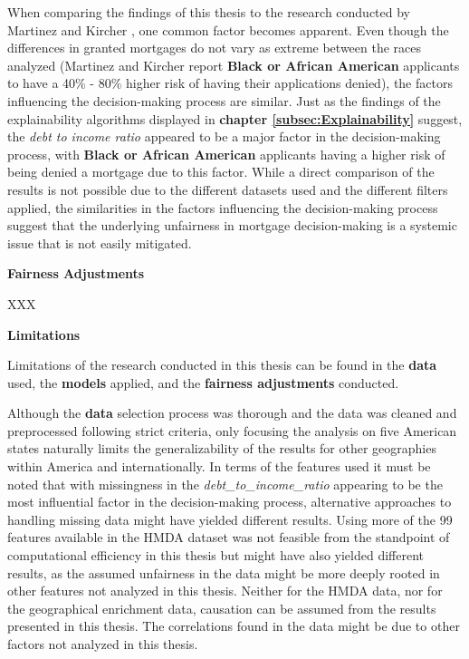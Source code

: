 When comparing the findings of this thesis to the research conducted by Martinez and Kircher \parencite{Martinez2021}, one common factor becomes apparent. Even though the differences in granted mortgages do not vary as extreme between the races analyzed (Martinez and Kircher report \textbf{Black or African American} applicants to have a 40\% - 80\% higher risk of having their applications denied), the factors influencing the decision-making process are similar.
Just as the findings of the explainability algorithms displayed in \textbf{chapter \ref{subsec:Explainability}} suggest, the \textit{debt to income ratio} appeared to be a major factor in the decision-making process, with \textbf{Black or African American} applicants having a higher risk of being denied a mortgage due to this factor.
While a direct comparison of the results is not possible due to the different datasets used and the different filters applied, the similarities in the factors influencing the decision-making process suggest that the underlying unfairness in mortgage decision-making is a systemic issue that is not easily mitigated.

\textbf{Fairness Adjustments}


XXX

\textbf{Limitations}

Limitations of the research conducted in this thesis can be found in the \textbf{data} used, the \textbf{models} applied, and the \textbf{fairness adjustments} conducted.


Although the \textbf{data} selection process was thorough and the data was cleaned and preprocessed following strict criteria, only focusing the analysis on five American states naturally limits the generalizability of the results for other geographies within America and internationally.
In terms of the features used it must be noted that with missingness in the \textit{debt\_to\_income\_ratio} appearing to be the most influential factor in the decision-making process, alternative approaches to handling missing data might have yielded different results.
Using more of the 99 features available in the HMDA dataset was not feasible from the standpoint of computational efficiency in this thesis but might have also yielded different results, as the assumed unfairness in the data might be more deeply rooted in other features not analyzed in this thesis.
Neither for the HMDA data, nor for the geographical enrichment data, causation can be assumed from the results presented in this thesis. The correlations found in the data might be due to other factors not analyzed in this thesis.


